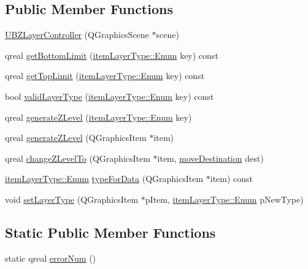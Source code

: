 \subsection*{Public Member Functions}
\begin{DoxyCompactItemize}
\item 
\hyperlink{class_u_b_z_layer_controller_a03eca8ff04e942fcb80db801801ee6eb}{U\-B\-Z\-Layer\-Controller} (Q\-Graphics\-Scene $\ast$scene)
\item 
qreal \hyperlink{class_u_b_z_layer_controller_a0df67dd966439929d320765984e5e834}{get\-Bottom\-Limit} (\hyperlink{structitem_layer_type_a94572e74aaa23902038cf97f28ec5a4d}{item\-Layer\-Type\-::\-Enum} key) const 
\item 
qreal \hyperlink{class_u_b_z_layer_controller_ad8a9e770b878066c4e9dc7bf18d5fda6}{get\-Top\-Limit} (\hyperlink{structitem_layer_type_a94572e74aaa23902038cf97f28ec5a4d}{item\-Layer\-Type\-::\-Enum} key) const 
\item 
bool \hyperlink{class_u_b_z_layer_controller_adda3ea374db9b6e353a188b4c9a7b535}{valid\-Layer\-Type} (\hyperlink{structitem_layer_type_a94572e74aaa23902038cf97f28ec5a4d}{item\-Layer\-Type\-::\-Enum} key) const 
\item 
qreal \hyperlink{class_u_b_z_layer_controller_a2d0d1251e0ad4f984f1dff3051a77e21}{generate\-Z\-Level} (\hyperlink{structitem_layer_type_a94572e74aaa23902038cf97f28ec5a4d}{item\-Layer\-Type\-::\-Enum} key)
\item 
qreal \hyperlink{class_u_b_z_layer_controller_a9d5f5f5b5ed0676bb9c7e069fae14d08}{generate\-Z\-Level} (Q\-Graphics\-Item $\ast$item)
\item 
qreal \hyperlink{class_u_b_z_layer_controller_a4f1e0978d7b586d378c1c35d46ac6ee2}{change\-Z\-Level\-To} (Q\-Graphics\-Item $\ast$item, \hyperlink{class_u_b_z_layer_controller_aaea26acb88959955623736b3127f96b3}{move\-Destination} dest)
\item 
\hyperlink{structitem_layer_type_a94572e74aaa23902038cf97f28ec5a4d}{item\-Layer\-Type\-::\-Enum} \hyperlink{class_u_b_z_layer_controller_a93fe7dc3f86bb3daff7b48a7a8d97ea7}{type\-For\-Data} (Q\-Graphics\-Item $\ast$item) const 
\item 
void \hyperlink{class_u_b_z_layer_controller_ad5800f9c85401ba1d5d7a74371170ce5}{set\-Layer\-Type} (Q\-Graphics\-Item $\ast$p\-Item, \hyperlink{structitem_layer_type_a94572e74aaa23902038cf97f28ec5a4d}{item\-Layer\-Type\-::\-Enum} p\-New\-Type)
\end{DoxyCompactItemize}
\subsection*{Static Public Member Functions}
\begin{DoxyCompactItemize}
\item 
static qreal \hyperlink{class_u_b_z_layer_controller_a1dc0a9d321bdfa56f71b82e90dc05acd}{error\-Num} ()
\end{DoxyCompactItemize}


